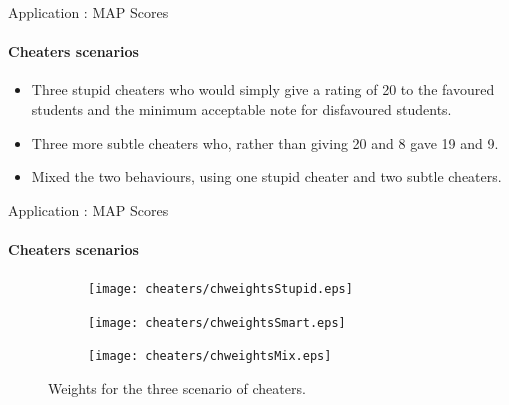 \begin{frame}{Application : MAP Scores}
    \framesubtitle{Cheaters scenarios}
    \begin{itemize}
        \item Three stupid cheaters who would simply give a rating of 20 to the favoured students and the minimum acceptable note for disfavoured students.
        \item Three more subtle cheaters who, rather than giving 20 and 8 gave 19 and 9.
        \item Mixed the two behaviours, using one stupid cheater and two subtle cheaters.
    \end{itemize}
\end{frame}

\begin{frame}{Application : MAP Scores}
    \framesubtitle{Cheaters scenarios}
\begin{figure}[!ht]
\begin{subfigure}[b]{0.32\textwidth}
\texttt{[image: cheaters/chweightsStupid.eps]}
\end{subfigure}
\begin{subfigure}[b]{0.32\textwidth}
\texttt{[image: cheaters/chweightsSmart.eps]}
\end{subfigure}
\begin{subfigure}[b]{0.32\textwidth}
\texttt{[image: cheaters/chweightsMix.eps]}
\end{subfigure}
\caption{Weights for the three scenario of cheaters\label{weightch}.}
\end{figure}
\end{frame}

